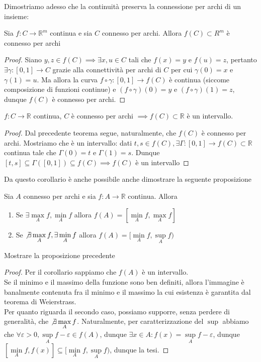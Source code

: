 \noindent Dimostriamo adesso che la continuità preserva la connessione per archi di un insieme:
\begin{theorem}[teorema C4]
	Sia $f: C \to \mathbb{R}^m$ continua e sia $C$ connesso per archi. Allora $f(C) \subset R^m$ è connesso per archi
\end{theorem}
\begin{proof}
Siano $y, z \in f(C) \implies \exists x, u \in C$ tali che $f(x) = y$ e $f(u) = z$, pertanto $\exists \gamma : [0,1] \to C$ grazie alla connettività per archi di $C$ per cui $\gamma(0) = x$ e $\gamma(1) = u$. Ma allora la curva $f \circ \gamma: [0,1] \to f(C)$ è continua (siccome composizione di funzioni continue) e $(f \circ \gamma)(0) = y$ e $(f \circ \gamma)(1) = z$, dunque $f(C)$ è connesso per archi.
\end{proof}
\begin{cor}
$f: C \to \mathbb{R}$ continua, $C$ è connesso per archi $\implies f(C) \subset \mathbb{R}$ è un intervallo. 
\end{cor}
\begin{proof}
Dal precedente teorema segue, naturalmente, che $f(C)$ è connesso per archi. Mostriamo che è un intervallo: dati $t, s \in f(C), \exists \Gamma: [0,1] \to f(C) \subset \mathbb{R}$ continua tale che $\Gamma(0) = t$ e $\Gamma(1) = s$. Dunque $[t,s] \subseteq \Gamma([0, 1]) \subseteq f(C) \implies f(C)$ è un intervallo
\end{proof}
\noindent Da questo corollario è anche possibile anche dimostrare la seguente proposizione
\begin{prop}
Sia $A$ connesso per archi e sia $f: A \to \mathbb{R}$ continua. Allora
\begin{enumerate}[label=\protect\circled{\arabic*}]
	\item Se $\exists \max\limits_{A} f, \min\limits_{A} f$ allora $f(A) = [\min\limits_{A} f, \max\limits_{A} f]$
	\item Se $\not\exists \max\limits_{A} f, \exists \min\limits_{A} f$ allora $f(A)=[\min\limits_{A} f, \sup\limits_{A} f)$
\end{enumerate}
\end{prop}
\begin{exercise}
Mostrare la proposizione precedente
\end{exercise}
\begin{proof}
Per il corollario sappiamo che $f(A)$ è un intervallo. \\
Se il minimo e il massimo della funzione sono ben definiti, allora l'immagine è banalmente contenuta fra il minimo e il massimo la cui esistenza è garantita dal teorema di Weierstrass. \\
Per quanto riguarda il secondo caso, possiamo supporre, senza perdere di generalità, che $\not\exists \max\limits_{A} f$. Naturalmente, per caratterizzazione del $\sup$ abbiamo che $\forall \varepsilon > 0, \sup\limits_{A}{f} - \varepsilon \in f(A)$, dunque $\exists x \in A: f(x) = \sup\limits_{A}{f} - \varepsilon$, dunque $[\min\limits_{A} f, f(x)] \subseteq [\min\limits_A{f}, \sup\limits_{A}{f})$, dunque la tesi.
\end{proof}
